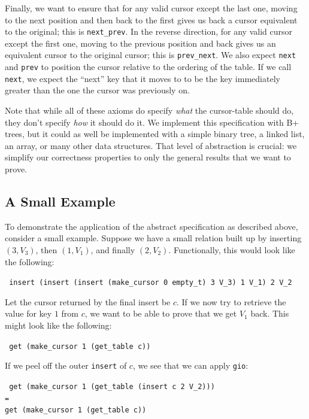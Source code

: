 \documentclass[12pt]{article}
\begin{document}
Finally, we want to ensure that for any valid cursor except the last one, moving to the next position and then back to the first gives us back a cursor equivalent to the original; this is \texttt{next\_prev}. In the reverse direction, for any valid cursor except the first one, moving to the previous position and back gives us an equivalent cursor to the original cursor; this is \texttt{prev\_next}. We also expect \texttt{next} and \texttt{prev} to position the cursor relative to the ordering of the table. If we call \texttt{next}, we expect the “next” key that it moves to to be the key immediately greater than the one the cursor was previously on.

Note that while all of these axioms do specify \textit{what} the cursor-table should do, they don’t specify \textit{how} it should do it. We implement this specification with B+\,trees, but it could as well be implemented with a simple binary tree, a linked list, an array, or many other data structures. That level of abstraction is crucial: we simplify our correctness properties to only the general results that we want to prove.

\subsection{A Small Example} \label{subsec:ex}
\setlength{\parskip}{0em}

To demonstrate the application of the abstract specification as described above, consider a small example. Suppose we have a small relation built up by inserting $(3,V_3)$, then $(1,V_1)$, and finally $(2,V_2)$. Functionally, this would look like the following:

\begin{center}\texttt{
    insert (insert (insert (make\_cursor 0 empty\_t) 3 V\_3) 1 V\_1) 2 V\_2
}\end{center}

Let the cursor returned by the final insert be $c$. If we now try to retrieve the value for key $1$ from $c$, we want to be able to prove that we get $V_1$ back. This might look like the following:

\begin{center}\texttt{
    get (make\_cursor 1 (get\_table c))
}\end{center}

If we peel off the outer \texttt{insert} of $c$, we see that we can apply \texttt{gio}:

\begin{center}\texttt{
    get (make\_cursor 1 (get\_table (insert c 2 V\_2))) \\
    = \\
    get (make\_cursor 1 (get\_table c))
}\end{center}
\end{document}
